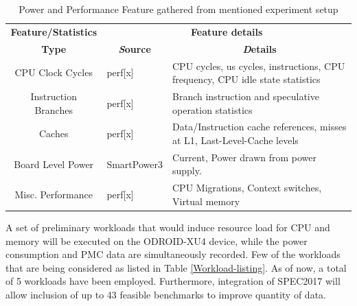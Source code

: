 \documentclass[conference]{IEEEtran}
\begin{document}
        \begin{table}[htbp]
            \caption{Power and Performance Feature gathered from mentioned experiment setup}
            \begin{center}
                \begin{tabular}{|c|p{1.8cm}|p{3.9cm}|}
                    \hline
                    \textbf{Feature/Statistics}&\multicolumn{2}{|c|}{\textbf{Feature details }} \\
                    \cline{2-3} 
                    \textbf{Type} & \multicolumn{1}{|c|}{\textbf{\textit Source}} & \multicolumn{1}{|c|}{\textbf{\textit Details}} \\
                    \hline
                    CPU Clock Cycles  & perf[x]  & CPU cycles, us cycles, instructions, CPU frequency, CPU idle state statistics \\
                    \hline
                    Instruction Branches  & perf[x]  & Branch instruction and speculative operation statistics \\
                    \hline
                    Caches   & perf[x]  & Data/Instruction cache references, misses at L1, Last-Level-Cache levels  \\
                    \hline
                    Board Level Power & SmartPower3\cite{odroid-smartpower3} & Current, Power drawn from power supply. \\
                    \hline
                    Misc. Performance  & perf[x]  & CPU Migrations, Context switches, Virtual memory \\
                    \hline
                \end{tabular}
                \label{Power-Perf-data-gathered}
            \end{center}
        \end{table}

        \par A set of preliminary workloads that would induce resource load for CPU and memory will be executed on the ODROID-XU4 device, while the power consumption and PMC data are simultaneously recorded. Few of the workloads that are being considered as listed in Table \ref{Workload-listing}. As of now, a total of 5 workloads have been employed. Furthermore, integration of SPEC2017 will allow inclusion of up to 43 feasible benchmarks to improve quantity of data.
\end{document}
